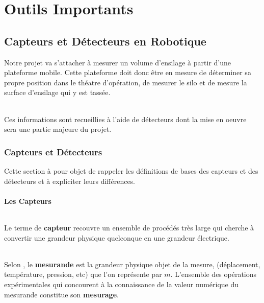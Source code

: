 \documentclass[12pt,a4paper]{report}
\begin{document}
\part{Outils Importants }

\chapter{Capteurs et Détecteurs en Robotique}

Notre projet va s'attacher à mesurer un volume d'ensilage à partir d'une plateforme mobile. Cette plateforme doit donc être en mesure de déterminer sa propre position dans le théatre d'opération, de mesurer le silo et de mesure la surface d'ensilage qui y est tassée.

\paragraph{} Ces informations sont recueillies à l'aide de détecteurs dont la mise en oeuvre sera une partie majeure du projet.

\section{Capteurs et Détecteurs}

Cette section à pour objet de rappeler les définitions de bases des capteurs et des détecteurs et à expliciter leurs différences.

\subsection{Les Capteurs}

\paragraph{}Le terme de \textbf{capteur} recouvre un ensemble de procédés très large qui cherche à convertir une grandeur physique quelconque en une grandeur électrique. 

\paragraph{} Selon \cite{asch_les_2010}, le \textbf{mesurande} est la grandeur physique objet de la mesure, (déplacement, température, pression, etc) que l'on représente par $m$. L'ensemble des opérations expérimentales qui concourent à la connaissance de la valeur numérique du mesurande constitue son \textbf{mesurage}.
\end{document}
